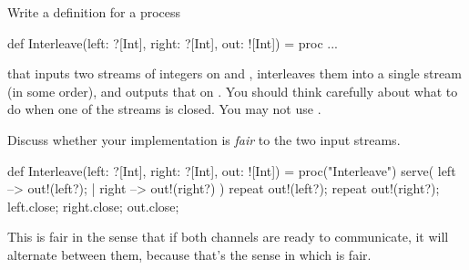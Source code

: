 \begin{question}
Write a definition for a process
%
\begin{scala}
def Interleave(left: ?[Int], right: ?[Int], out: ![Int]) = proc ...
\end{scala}
that inputs two streams of integers on  and ,
interleaves them into a single stream (in some order), and outputs that on
.  You should think carefully about what to do when one of the
streams is closed.  You may not use .

Discuss whether your implementation is \emph{fair} to the two input streams. 
\end{question}


\begin{answer}
\Small
\begin{scala}
  def Interleave(left: ?[Int], right: ?[Int], out: ![Int]) 
  = proc("Interleave"){
    serve(
      left --> { out!(left?); }
      | right --> { out!(right?) }
    )
    repeat{ out!(left?); }
    repeat{ out!(right?); }
    left.close; right.close; out.close;
  }
\end{scala}








This is fair in the sense that if both channels are ready to communicate, it
will alternate between them, because that's the sense in which 
is fair. 
\end{answer}

